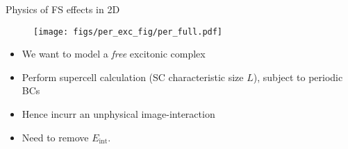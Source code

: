 \documentclass[10pt, pdf, hyperref={draft}, usenames, dvipsnames]{beamer}
\newcommand{\red}[1]{{\bf\color{LancsRed}{#1}}}
\begin{document}

\begin{frame}{Physics of FS effects in 2D}
\begin{minipage}[t]{0.5\textwidth}
\vfill
\begin{center}
  \begin{figure}[H]
    \centering
    \texttt{[image: figs/per\_exc\_fig/per\_full.pdf]}
  \end{figure}
\vfill
\end{center}
\end{minipage}%
\hfill
\begin{minipage}[t]{0.5\textwidth}
\vspace{1.4cm}
\begin{itemize}
\item We want to model a \textit{free} excitonic complex
\item Perform supercell calculation (SC characteristic size $L$), subject to periodic BCs
\item Hence incurr an unphysical image-interaction
\end{itemize}
\end{minipage}%
\vfill
\begin{itemize}
\item Need to remove $E_{\text{int}}$. \red{How does it scale?}
\end{itemize}
\end{frame}
\end{document}
